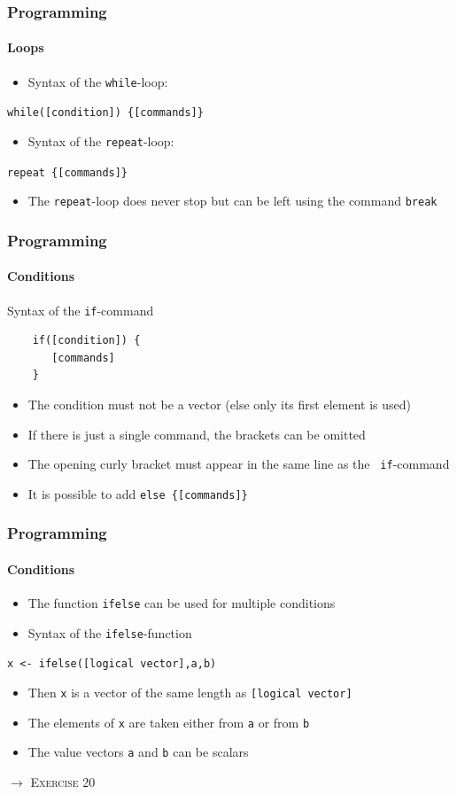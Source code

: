 \documentclass[title={Introduction to R}, author={Mutschler and Zaharieva}, inst={Institute for Econometrics and Empirical Economics}]{beamer}
\begin{document}
\begin{frame}
\frametitle{Programming}
\framesubtitle{Loops}
\begin{itemize}
\item Syntax of the \texttt{while}-loop:
\end{itemize}
\begin{center}
\texttt{while([condition]) \{[commands]\}}
\end{center}
\begin{itemize}
\item Syntax of the \texttt{repeat}-loop:
\end{itemize}
\begin{center}
\texttt{repeat \{[commands]\}}
\end{center}
\begin{itemize}
\item The \texttt{repeat}-loop does never stop but can be left using the
command \texttt{break}
\end{itemize}
\end{frame}


\begin{frame}[fragile]
\frametitle{Programming}
\framesubtitle{Conditions}
Syntax of the \texttt{if}-command
\begin{verbatim}
    if([condition]) {
       [commands]
    }
\end{verbatim}
\begin{itemize}
\item The condition must not be a vector
(else only its first element is used)
\item If there is just a single command, the brackets can be omitted
\item The opening curly bracket must appear in the same line as the \texttt{%
if}-command
\item It is possible to add \texttt{else \{[commands]\}}
\end{itemize}
\end{frame}


\begin{frame}
\frametitle{Programming}
\framesubtitle{Conditions}
\begin{itemize}
\item The function \texttt{ifelse} can be used for multiple conditions
\item Syntax of the \texttt{ifelse}-function
\end{itemize}
\begin{center}
\texttt{x <- ifelse([logical vector],a,b)}
\end{center}
\begin{itemize}
\item Then \texttt{x} is a vector of the same length as \texttt{[logical
vector]}
\item The elements of \texttt{x} are taken either from \texttt{a} or from 
\texttt{b}
\item The value vectors \texttt{a} and \texttt{b} can be scalars
\end{itemize}\pause
$\longrightarrow $ \textsc{Exercise 20}
\end{frame}
\end{document}
